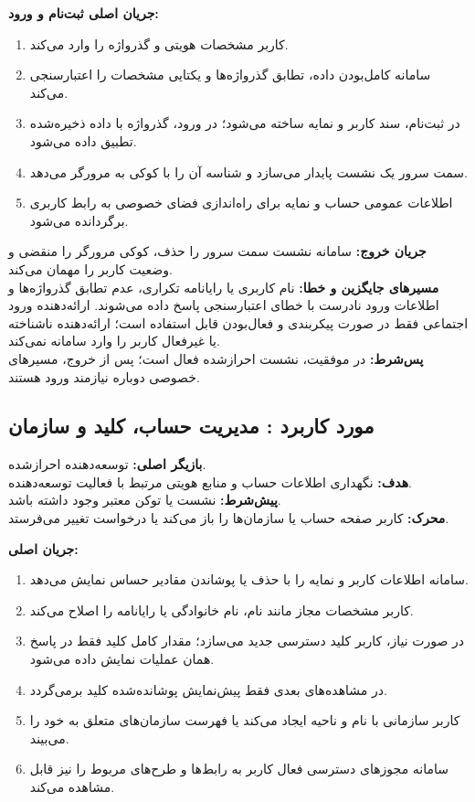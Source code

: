 
\noindent\textbf{جریان اصلی ثبت‌نام و ورود:}
\begin{enumerate}
  \item کاربر مشخصات هویتی و گذرواژه را وارد می‌کند.
  \item سامانه کامل‌بودن داده، تطابق گذرواژه‌ها و یکتایی مشخصات را اعتبارسنجی می‌کند.
  \item در ثبت‌نام، سند کاربر و نمایه ساخته می‌شود؛ در ورود، گذرواژه با داده ذخیره‌شده تطبیق داده می‌شود.
  \item سمت سرور یک نشست پایدار می‌سازد و شناسه آن را با کوکی  به مرورگر می‌دهد.
  \item اطلاعات عمومی حساب و نمایه برای راه‌اندازی فضای خصوصی به رابط کاربری برگردانده می‌شود.
\end{enumerate}

\noindent\textbf{جریان خروج:}
سامانه نشست سمت سرور را حذف، کوکی مرورگر را منقضی و وضعیت کاربر را مهمان می‌کند.\\
\textbf{مسیرهای جایگزین و خطا:}
نام کاربری یا رایانامه تکراری، عدم تطابق گذرواژه‌ها و اطلاعات ورود نادرست با خطای اعتبارسنجی پاسخ داده می‌شوند. ارائه‌دهنده ورود اجتماعی فقط در صورت پیکربندی و فعال‌بودن قابل استفاده است؛ ارائه‌دهنده ناشناخته یا غیرفعال کاربر را وارد سامانه نمی‌کند.\\
\textbf{پس‌شرط:} در موفقیت، نشست احرازشده فعال است؛ پس از خروج، مسیرهای خصوصی دوباره نیازمند ورود هستند.

\UseCaseStart
\subsection{مورد کاربرد : مدیریت حساب، کلید و سازمان}
\noindent\textbf{بازیگر اصلی:} توسعه‌دهنده احرازشده.\\
\textbf{هدف:} نگهداری اطلاعات حساب و منابع هویتی مرتبط با فعالیت توسعه‌دهنده.\\
\textbf{پیش‌شرط:} نشست یا توکن معتبر وجود داشته باشد.\\
\textbf{محرک:} کاربر صفحه حساب یا سازمان‌ها را باز می‌کند یا درخواست تغییر می‌فرستد.


\noindent\textbf{جریان اصلی:}
\begin{enumerate}
  \item سامانه اطلاعات کاربر و نمایه را با حذف یا پوشاندن مقادیر حساس نمایش می‌دهد.
  \item کاربر مشخصات مجاز مانند نام، نام خانوادگی یا رایانامه را اصلاح می‌کند.
  \item در صورت نیاز، کاربر کلید دسترسی جدید می‌سازد؛ مقدار کامل کلید فقط در پاسخ همان عملیات نمایش داده می‌شود.
  \item در مشاهده‌های بعدی فقط پیش‌نمایش پوشانده‌شده کلید برمی‌گردد.
  \item کاربر سازمانی با نام و ناحیه ایجاد می‌کند یا فهرست سازمان‌های متعلق به خود را می‌بیند.
  \item سامانه مجوزهای دسترسی فعال کاربر به رابط‌ها و طرح‌های مربوط را نیز قابل مشاهده می‌کند.
\end{enumerate}

